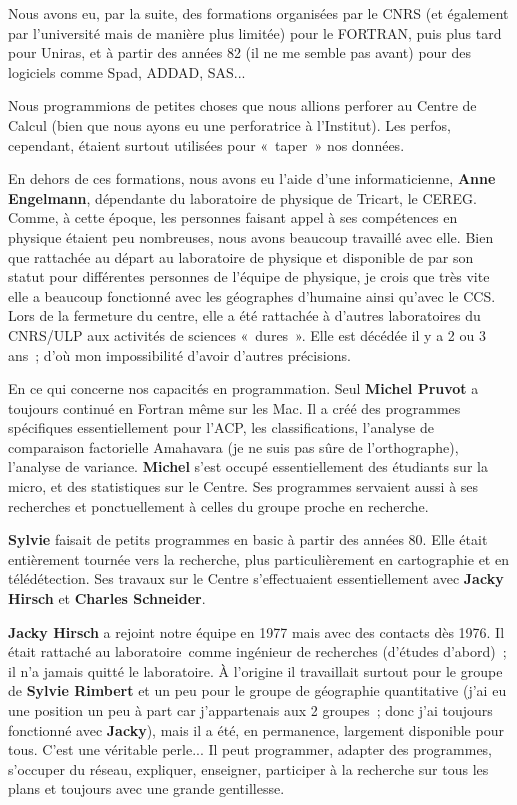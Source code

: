 Nous avons eu, par la suite, des formations organisées par le CNRS (et également par l’université mais de manière plus limitée) pour le FORTRAN, puis plus tard pour Uniras, et à partir des années 82 (il ne me semble pas avant) pour des logiciels comme Spad, ADDAD, SAS...

Nous programmions de petites choses que nous allions perforer au Centre de Calcul (bien que nous ayons eu une perforatrice à l’Institut). Les perfos, cependant, étaient surtout utilisées pour « taper » nos données. 

En dehors de ces formations, nous avons eu l’aide d’une informaticienne, \textbf{Anne Engelmann}, dépendante du laboratoire de physique de Tricart, le CEREG. Comme, à cette époque, les personnes faisant appel à ses compétences en physique étaient peu nombreuses, nous avons beaucoup travaillé avec elle. Bien que rattachée au départ au laboratoire de physique et disponible de par son statut pour différentes personnes de l’équipe de physique, je crois que très vite elle a beaucoup fonctionné avec les géographes d’humaine ainsi qu’avec le CCS. Lors de la fermeture du centre, elle a été rattachée à d’autres laboratoires du CNRS/ULP aux activités de sciences « dures ». Elle est décédée il y a 2 ou 3 ans ; d’où mon impossibilité d’avoir d’autres précisions.

En ce qui concerne nos capacités en programmation. Seul \textbf{Michel Pruvot} a toujours continué en Fortran même sur les Mac. Il a créé des programmes spécifiques essentiellement pour l’ACP, les classifications, l’analyse de comparaison factorielle Amahavara (je ne suis pas sûre de l’orthographe), l’analyse de variance. \textbf{Michel} s’est occupé essentiellement des étudiants sur la micro, et des statistiques sur le Centre. Ses programmes servaient aussi à ses recherches et ponctuellement à celles du groupe proche en recherche. 

\textbf{Sylvie} faisait de petits programmes en basic à partir des années 80. Elle était entièrement tournée vers la recherche, plus particulièrement en cartographie et en télédétection. Ses travaux sur le Centre s’effectuaient essentiellement avec \textbf{Jacky Hirsch} et \textbf{Charles Schneider}. 

\textbf{Jacky Hirsch} a rejoint notre équipe en 1977 mais avec des contacts dès 1976. Il était rattaché au laboratoire comme ingénieur de recherches (d’études d’abord) ; il n’a jamais quitté le laboratoire. À l’origine il travaillait surtout pour le groupe de \textbf{Sylvie Rimbert} et un peu pour le groupe de géographie quantitative (j’ai eu une position un peu à part car j’appartenais aux 2 groupes ; donc j’ai toujours fonctionné avec \textbf{Jacky}), mais il a été, en permanence, largement disponible pour tous. C’est une véritable perle... Il peut programmer, adapter des programmes, s’occuper du réseau, expliquer, enseigner, participer à la recherche sur tous les plans et toujours avec une grande gentillesse.


